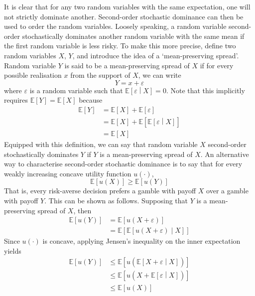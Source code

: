 \documentclass[11pt]{report} %
\begin{document}
It is clear that for any two random variables with the same expectation, one will not strictly dominate another. Second-order stochastic dominance can then be used to order the random variables. Loosely speaking, a random variable second-order stochastically dominates another random variable with the same mean if the first random variable is less risky. To make this more precise, define two random variables $X$, $Y$, and introduce the idea of a `mean-preserving spread'. Random variable $Y$ is said to be a mean-preserving spread of $X$ if for every possible realisation $x$ from the support of $X$, we can write
\begin{equation}
Y = x + \varepsilon
\end{equation}
where $\varepsilon$ is a random variable such that $\mathbb{E}\left[\varepsilon\middle|X\right] = 0$. Note that this implicitly requires $\mathbb{E}\left[Y\right] = \mathbb{E}\left[X\right]$ because
\begin{align}
\mathbb{E}\left[Y\right] &= \mathbb{E}\left[X\right] + \mathbb{E}\left[\varepsilon\right] \\
&= \mathbb{E}\left[X\right] + \mathbb{E}\left[\mathbb{E}\left[\varepsilon\middle|X\right]\right] \\
&= \mathbb{E}\left[X\right]
\end{align}
Equipped with this definition, we can say that random variable $X$ second-order stochastically dominates $Y$ if $Y$ is a mean-preserving spread of $X$. An alternative way to characterise second-order stochastic dominance is to say that for every weakly increasing concave utility function $u\left(\cdot\right)$, 
\begin{equation}
\mathbb{E}\left[u\left(X\right)\right] \geq \mathbb{E}\left[u\left(Y\right)\right]
\end{equation}
That is, every risk-averse decision prefers a gamble with payoff $X$ over a gamble with payoff $Y$. This can be shown as follows. Supposing that $Y$ is a mean-preserving spread of $X$, then
\begin{align}
\mathbb{E}\left[u\left(Y\right)\right] &= \mathbb{E}\left[u\left(X + \varepsilon\right)\right] \\
&= \mathbb{E}\left[\mathbb{E}\left[u\left(X + \varepsilon\right)\middle|X\right]\right]
\end{align}
Since $u\left(\cdot\right)$ is concave, applying Jensen's inequality on the inner expectation yields
\begin{align}
\mathbb{E}\left[u\left(Y\right)\right] &\leq \mathbb{E}\left[u\left(\mathbb{E}\left[X + \varepsilon\middle|X\right]\right)\right] \\
&\leq \mathbb{E}\left[u\left(X + \mathbb{E}\left[\varepsilon\middle|X\right]\right)\right] \\
&\leq \mathbb{E}\left[u\left(X\right)\right]
\end{align}
\end{document}

